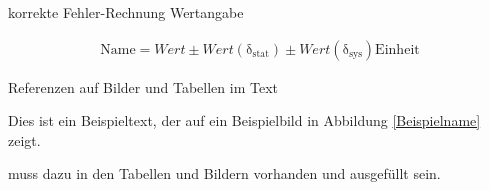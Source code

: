 korrekte Fehler-Rechnung Wertangabe

\begin{align}
\mathrm{Name} = Wert \pm Wert \mathrm{(\delta_{stat})} \pm Wert \mathrm{(\delta_{sys})}\mathrm{Einheit}
\end{align}



Referenzen auf Bilder und Tabellen im Text

Dies ist ein Beispieltext, der auf ein Beispielbild in Abbildung \ref{Beispielname} zeigt.

\label{Beispielname} muss dazu in den Tabellen und Bildern vorhanden und ausgefüllt sein.

